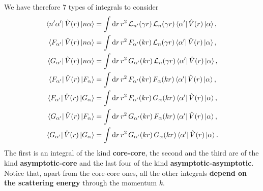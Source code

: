 \documentclass[10pt,a4paper]{article}
\DeclarePairedDelimiter\Bra{\langle}{\rvert}
\DeclarePairedDelimiter\Ket{\lvert}{\rangle}
\newcommand{\bra}[1]{\Bra{#1}}
\newcommand{\ket}[1]{\Ket{#1}}
\newcommand{\matrixelement}[3]{\bra{#1}\,#2\,\ket{#3}}
\newcommand{\de}[1]{\mathrm{d}#1\,}
\begin{document}
	 We have therefore 7 types of integrals to consider
	 \begin{align}
	 	\matrixelement{n'\alpha'}{\hat{V}(r)}{n\alpha} &= \int \de{r}r^2\,\mathcal{L}_{n'}(\gamma r)\,
	 	\mathcal{L}_{n}(\gamma r)\,
	 	\matrixelement{\alpha'}{\hat{V}(r)}{\alpha}\,,\\
	 	\matrixelement{F_{\alpha'}}{\hat{V}(r)}{n\alpha} &= \int \de{r}r^2\,
	 	F_{\alpha'}(kr)
	 	\,\mathcal{L}_n(\gamma r)\,
	 	\matrixelement{\alpha'}{\hat{V}(r)}{\alpha}\,,\\
	 	\matrixelement{G_{\alpha'}}{\hat{V}(r)}{n\alpha} &= \int \de{r}r^2\,
	 	G_{\alpha'}(kr)
	 	\,\mathcal{L}_n(\gamma r)\,
	 	\matrixelement{\alpha'}{\hat{V}(r)}{\alpha}\,,\\
	 	\matrixelement{F_{\alpha'}}{\hat{V}(r)}{F_\alpha} &= \int \de{r}r^2\,F_{\alpha'}(kr)\,
	 	F_{\alpha}(kr)\,
	 	\matrixelement{\alpha'}{\hat{V}(r)}{\alpha}\,,\\
	 	\matrixelement{F_{\alpha'}}{\hat{V}(r)}{G_\alpha} &= \int \de{r}r^2\,F_{\alpha'}(kr)\,
	 	G_{\alpha}(kr)\,
	 	\matrixelement{\alpha'}{\hat{V}(r)}{\alpha}\,,\\
	 	\matrixelement{G_{\alpha'}}{\hat{V}(r)}{F_\alpha} &= \int \de{r}r^2\,G_{\alpha'}(kr)\,
	 	F_{\alpha}(kr)\,
	 	\matrixelement{\alpha'}{\hat{V}(r)}{\alpha}\,,\\
	 	\matrixelement{G_{\alpha'}}{\hat{V}(r)}{G_\alpha} &= \int \de{r}r^2\,G_{\alpha'}(kr)\,
	 	G_{\alpha}(kr)\,
	 	\matrixelement{\alpha'}{\hat{V}(r)}{\alpha}\,.
	 \end{align}
	 The first is an integral of the kind \textbf{core-core}, the second and the third are of the kind \textbf{asymptotic-core} and the last four of the kind \textbf{asymptotic-asymptotic}.\\
	 Notice that, apart from the core-core ones, all the other integrals \textbf{depend on the scattering energy} through the momentum $k$.
	 
\end{document}
